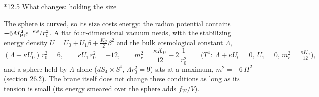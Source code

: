 \documentclass[10pt,a4paper]{article}
\makeatletter
\renewcommand\subsection{\@startsection{subsection}{2}{\z@}{-3.25ex\@plus -1ex \@minus -.2ex}{1.5ex \@plus .2ex}{\normalfont\large\bfseries\raggedright}}
\makeatother
\begin{document}
\subsection*{12.5 What changes: holding the size}
The sphere is curved, so its size costs energy: the radion potential contains $-6M_{\rm Pl}^2e^{-6\beta}/r_0^2$. A flat four-dimensional vacuum needs, with the stabilizing energy density $U=U_0+U_1\beta+\frac{K_U}2\beta^2$ and the bulk cosmological constant $\Lambda$,
\begin{equation*}
(\Lambda+\kappa U_0)\,r_0^2=6,\qquad \kappa U_1\,r_0^2=-12,\qquad m_r^2=\frac{\kappa K_U}{12}-2\,\frac1{r_0^2}\qquad\big(T^4:\ \Lambda+\kappa U_0=0,\ U_1=0,\ m_r^2=\tfrac{\kappa K_U}{12}\big),
\end{equation*}
and a sphere held by $\Lambda$ alone ($dS_4\times S^4$, $\Lambda r_0^2=9$) sits at a maximum, $m^2=-6\,H^2$ (section 26.2). The brane itself does not change these conditions as long as its tension is small (its energy smeared over the sphere adds $f_W/V$).
\end{document}
